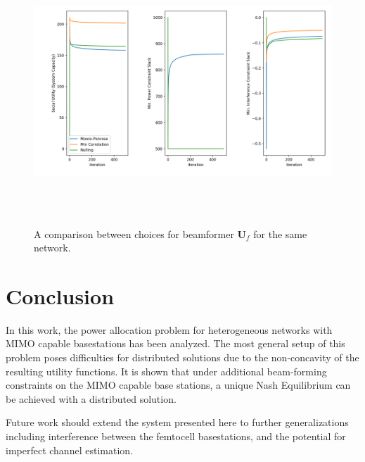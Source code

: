 \documentclass[12pt,a4paper]{report}
\begin{document}
\begin{figure}[H]\label{beamformer_comparison}
	\includegraphics[width= 15cm,height = 10cm]{figures/beamformer_comparison}
	  \caption{A comparison between choices for beamformer $\mathbf{U}_f$ for the same network.}
\end{figure}


\chapter{Conclusion}
In this work, the power allocation problem for heterogeneous networks with MIMO capable basestations has been analyzed. The most general setup of this problem poses difficulties for distributed solutions due to the non-concavity of the resulting utility functions. It is shown that under additional beam-forming constraints on the MIMO capable base stations, a unique Nash Equilibrium can be achieved with a distributed solution. 
\par
Future work should extend the system presented here to further generalizations including interference between the femtocell basestations, and the potential for imperfect channel estimation. 
\newpage

\end{document}

